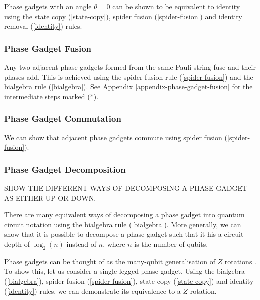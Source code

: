 Phase gadgets with an angle $\theta = 0$ can be shown to be equivalent to identity using the state copy (\ref{state-copy}), spider fusion (\ref{spider-fusion}) and identity removal (\ref{identity}) rules.



\subsubsection{Phase Gadget Fusion}%
\label{phase-gadget-fusion}

Any two adjacent phase gadgets formed from the same Pauli string fuse and their phases add. This is achieved using the spider fusion rule (\ref{spider-fusion}) and the bialgebra rule (\ref{bialgebra}). See Appendix  \ref{appendix-phase-gadget-fusion} for the intermediate steps marked (*).



\subsubsection{Phase Gadget Commutation}%
\label{phase-gadget-commutation}

We can show that adjacent phase gadgets commute using spider fusion (\ref{spider-fusion}).



\subsubsection{Phase Gadget Decomposition}%
\label{phase-gadget-decomposition}

SHOW THE DIFFERENT WAYS OF DECOMPOSING A PHASE GADGET AS EITHER UP OR DOWN.

There are many equivalent ways of decomposing a phase gadget into quantum circuit notation using the bialgebra rule (\ref{bialgebra}). More generally, we can show that it is possible to decompose a phase gadget such that it his a circuit depth of $\log_2(n)$ instead of $n$, where $n$ is the number of qubits.


Phase gadgets can be thought of as the many-qubit generalisation of $Z$ rotations \cite{Yeung2020}. To show this, let us consider a single-legged phase gadget. Using the bialgebra (\ref{bialgebra}), spider fusion (\ref{spider-fusion}), state copy (\ref{state-copy}) and identity (\ref{identity}) rules, we can demonstrate its equivalence to a $Z$ rotation.

\label{phase-gadget-single-leg}
